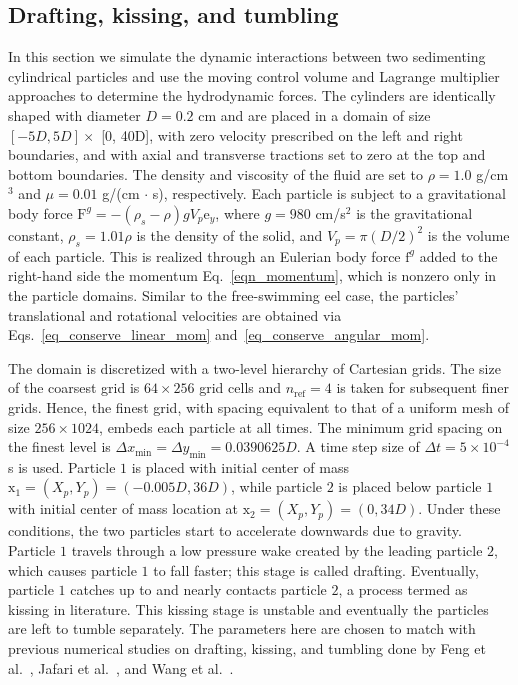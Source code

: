 \documentclass[review]{elsarticle}
\renewcommand{\vec}[1]{\bm{\mathrm{#1}}}
\def \x{\vec{x}}
\def \e{\vec{e}}
\def \F{\vec{F}}
\def \F{\vec{F}}
\def \e{\vec{e}}
\def \f{\vec{f}}
\def \nref{n_{\text{ref}}}
\def \x{\vec{x}}
\def \dt{\Delta t}
\def \dx{\Delta x}
\def \dy{\Delta y}
\def \dt{\Delta t}
\def \dx{\Delta x}
\newcommand{\REVIEW}[1]{{#1}}
\begin{document}
\REVIEW{
\subsection{Drafting, kissing, and tumbling} \label{sec_dkt_cylinders}
In this section we simulate the dynamic interactions between two sedimenting cylindrical particles and use 
the moving control volume and Lagrange multiplier approaches to determine the hydrodynamic forces. 
The cylinders are identically shaped with diameter $D = 0.2$ cm and are placed in a domain 
of size $[-5D, 5D] \times$ [0, 40D], with zero velocity prescribed on the left and right boundaries, 
and with axial and transverse tractions set to zero at the top and bottom boundaries. The density
and viscosity of the fluid are set to $\rho = 1.0$ g/cm$^3$ and $\mu = 0.01$ g/(cm $\cdot$ s), 
respectively. Each particle is subject to a gravitational body force 
$\F^{g} = -(\rho_s - \rho) g V_p \e_y$, where $g=980$ cm/s$^2$ is the gravitational
constant, $\rho_s = 1.01 \rho$ is the density of the solid, 
and $V_p = \pi (D/2)^2$ is the volume of each particle. This is realized through an Eulerian
body force $\f^g$ added to the right-hand side the momentum Eq.~\eqref{eqn_momentum}, 
which is nonzero only in the particle domains. Similar to the free-swimming eel case, 
the particles' translational and rotational velocities are obtained
via Eqs.~\eqref{eq_conserve_linear_mom} and~\eqref{eq_conserve_angular_mom}.

The domain is discretized with a two-level hierarchy of Cartesian grids. The size of the coarsest grid is
$64 \times 256$ grid cells and $\nref = 4$ is taken for subsequent finer grids. Hence, the finest grid, with
spacing equivalent to that of a uniform mesh of size $256 \times 1024$, embeds each particle at all times.
The minimum grid spacing on the finest level is $\dx_\textrm{min} = \dy_\textrm{min} = 0.0390625D$.
A time step size of $\dt = 5\times 10^{-4}$ s is used. Particle $1$ is placed with initial center of mass
$\x_1 = (X_p, Y_p) = (-0.005D, 36D)$, while particle $2$ is placed below particle $1$ with initial 
center of mass location at $\x_2 = (X_p, Y_p) = (0, 34D)$. Under these conditions, the two particles 
start to accelerate downwards due to gravity. Particle $1$ travels through a low pressure wake 
created by the leading particle $2$, which causes particle $1$ to fall faster; this stage is called drafting.
Eventually, particle $1$ catches up to and nearly contacts particle $2$, a process termed as kissing in 
literature. This kissing stage is unstable and eventually the particles are left to tumble separately. 
The parameters here are chosen to match with previous numerical studies on drafting, kissing, 
and tumbling done by Feng et al.~\cite{Feng04}, Jafari et al.~\cite{Jafari11}, and Wang et al.~\cite{Wang14}.

}
\end{document}
